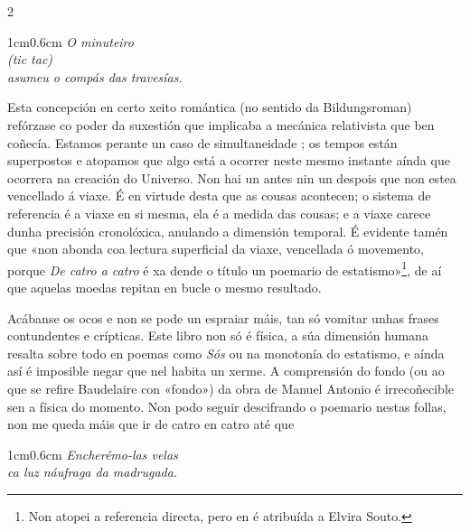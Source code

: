 \begin{multicols}{2}
\begin{adjustwidth}{1cm}{0.6cm}
    \textit{O minuteiro\\\text{} \hspace{4em} (tic tac)\\ asumeu o compás das travesías.}
\end{adjustwidth}

Esta concepción en certo xeito romántica (no sentido da Bildungsroman)
refórzase co poder da suxestión que implicaba a mecánica relativista que ben
coñecía. Estamos perante un caso de simultaneidade \cite{march}; os tempos
están superpostos e atopamos que algo está a ocorrer neste mesmo instante aínda
que ocorrera na creación do Universo. Non hai un antes nin un despois que non
estea vencellado á viaxe. É en virtude desta que as cousas acontecen; o sistema
de referencia é a viaxe en si mesma, ela é a medida das cousas; e a viaxe
carece dunha precisión cronolóxica, anulando a dimensión temporal. É evidente
tamén que «non abonda coa lectura superficial da viaxe, vencellada ó
movemento, porque \textit{De catro a catro} é xa dende o título un poemario de
estatismo»\footnote{Non atopei a referencia directa, pero en \cite{d4a4} é
atribuída a Elvira Souto.}, de aí que aquelas moedas repitan en bucle o mesmo
resultado.

Acábanse os ocos e non se pode un espraiar máis, tan só vomitar unhas frases
contundentes e crípticas. Este libro non só é física, a súa dimensión humana
resalta sobre todo en poemas como \textit{Sós} ou na monotonía do estatismo, e
aínda así é imposible negar que nel habita un xerme. A comprensión do fondo (ou
ao que se refire Baudelaire con «fondo») da obra de Manuel Antonio é
irrecoñecible sen a física do momento. Non podo seguir descifrando o poemario
nestas follas, non me queda máis que ir de catro en catro até que

\begin{adjustwidth}{1cm}{0.6cm}
    \textit{Encherémo-las velas\\ ca luz náufraga da madrugada}.
\end{adjustwidth}

\nocite{creacionismo}
\nocite{d4a4}
\nocite{dieste_xeometria}
\nocite{march}
\nocite{posibilidades}
\nocite{futurismo}

\printbibliography

\end{multicols}

